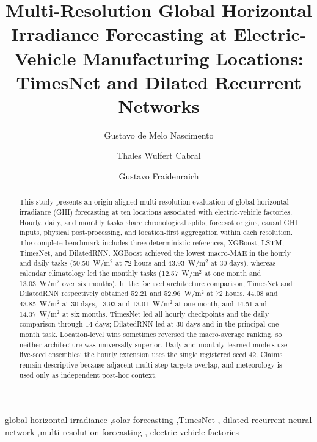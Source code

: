 \documentclass[final,5p,times,twocolumn]{elsarticle}
\begin{document}
\begin{frontmatter}

\title{Multi-Resolution Global Horizontal Irradiance Forecasting at Electric-Vehicle Manufacturing Locations: TimesNet and Dilated Recurrent Networks}

\author[unicamp]{Gustavo de Melo Nascimento}
\author[unicamp]{Thales Wulfert Cabral}
\author[unicamp]{Gustavo Fraidenraich}
\address[unicamp]{School of Electrical and Computer Engineering, University of Campinas, Campinas, SP, Brazil}

\begin{abstract}
This study presents an origin-aligned multi-resolution evaluation of global
horizontal irradiance (GHI) forecasting at ten locations associated with
electric-vehicle factories. Hourly, daily, and monthly tasks share
chronological splits, forecast origins, causal GHI inputs, physical
post-processing, and location-first aggregation within each resolution.
The complete benchmark includes three deterministic references, XGBoost,
LSTM, TimesNet, and DilatedRNN. XGBoost achieved the lowest macro-MAE in the
hourly and daily tasks (50.50~W/m$^2$ at 72 hours and 43.93~W/m$^2$ at
30 days), whereas calendar climatology led the monthly tasks (12.57~W/m$^2$
at one month and 13.03~W/m$^2$ over six months). In the focused architecture
comparison, TimesNet and DilatedRNN respectively obtained 52.21 and
52.96~W/m$^2$ at 72 hours, 44.08 and 43.85~W/m$^2$ at 30 days, 13.93
and 13.01~W/m$^2$ at one month, and 14.51 and 14.37~W/m$^2$ at six
months. TimesNet led all hourly checkpoints and the daily comparison through
14 days; DilatedRNN led at 30 days and in the principal one-month task.
Location-level wins sometimes reversed the macro-average ranking, so neither
architecture was universally superior. Daily and monthly learned models use
five-seed ensembles; the hourly extension uses the single registered seed 42.
Claims remain descriptive because adjacent multi-step targets overlap, and
meteorology is used only as independent post-hoc context.
\end{abstract}

\begin{keyword}
global horizontal irradiance \sep solar forecasting \sep TimesNet \sep
dilated recurrent neural network \sep multi-resolution forecasting \sep
electric-vehicle factories
\end{keyword}

\end{frontmatter}
\end{document}
